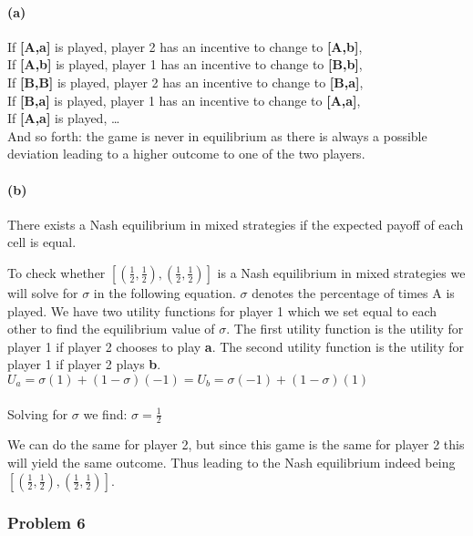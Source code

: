 \documentclass[]{article}
\let\oldparagraph\paragraph
\renewcommand{\paragraph}[1]{\oldparagraph{#1}\mbox{}}
\begin{document}
\paragraph{(a)}\label{a}

If \textbf{[A,a]} is played, player 2 has an incentive to change to
\textbf{[A,b]},\\
If \textbf{[A,b]} is played, player 1 has an incentive to change to
\textbf{[B,b]},\\
If \textbf{[B,B]} is played, player 2 has an incentive to change to
\textbf{[B,a]},\\
If \textbf{[B,a]} is played, player 1 has an incentive to change to
\textbf{[A,a]},\\
If \textbf{[A,a]} is played, \ldots{}\\
And so forth: the game is never in equilibrium as there is always a
possible deviation leading to a higher outcome to one of the two
players.

\paragraph{(b)}\label{b}

There exists a Nash equilibrium in mixed strategies if the expected
payoff of each cell is equal.

To check whether $[(\frac{1}{2},\frac{1}{2}),(\frac{1}{2},\frac{1}{2})] $ is a Nash equilibrium in mixed strategies we will solve for $\sigma$ in the following  equation. $\sigma$ denotes the percentage of times A is played. We have two utility functions for player 1 which we set equal to each other to find the equilibrium value of $\sigma$. The first utility function is the utility for player 1 if player 2 chooses to play \textbf{a}. The second utility function is the utility for player 1 if player 2 plays \textbf{b}.  \\

$
U_a=\sigma(1)+(1-\sigma)(-1)=U_b=\sigma(-1)+(1-\sigma)(1) $\\
\\
Solving for $\sigma$ we find:
$\sigma=\frac{1}{2}$

We can do the same for player 2, but since this game is the same for player 2 this will yield the same outcome. Thus leading to the Nash equilibrium indeed being $[(\frac{1}{2},\frac{1}{2}),(\frac{1}{2},\frac{1}{2})] $.


\subsubsection{Problem 6}\label{problem-6}
\end{document}
